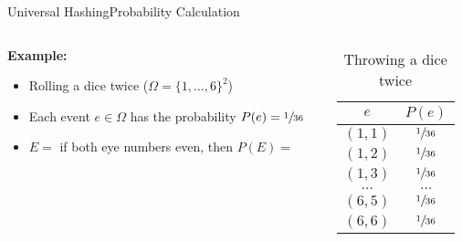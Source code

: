 
\begin{frame}{Universal Hashing}{Probability Calculation}
  \begin{columns}
    \begin{column}{0.65\linewidth}
      \textbf{Example:}
      \begin{itemize}
        \item<2->
          Rolling a dice twice ({\color{Mittel-Blau}$\Omega = \{1,\dots,6\}^2$})
        \item<3->
          Each event {\color{Mittel-Blau}$e \in \Omega$} has the probability
          {\color{Mittel-Blau}$P(e) = \sfrac{1}{36}$}
        \item<4->
          {\color{Mittel-Blau}$E =$} if both eye numbers even, then {\color{Mittel-Blau}$P(E)=$}
      \end{itemize}
    \end{column}
    \begin{column}{0.35\linewidth}
      \begin{table}[!h]
        \caption{Throwing a dice twice}
        \label{tab:probabilities_rolling_dice_twice}
        \begin{tabularx}{0.8\linewidth}{c|c}
          {\color{Mittel-Blau}$e$} &{\color{Mittel-Blau} $P(e)$}\\
          \midrule
          $(1, 1)$ & $\sfrac{1}{36}$\\
          $(1, 2)$ & $\sfrac{1}{36}$\\
          $(1, 3)$ & $\sfrac{1}{36}$\\
          $\dots$ & $\dots$\\
          $(6, 5)$ & $\sfrac{1}{36}$\\
          $(6, 6)$ & $\sfrac{1}{36}$\\
        \end{tabularx}
      \end{table}
    \end{column}
  \end{columns}
\end{frame}


